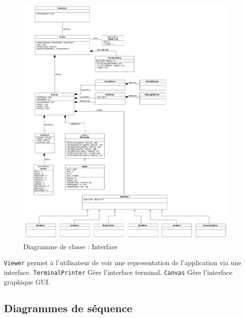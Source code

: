\documentclass[a4paper,10pt]{article}
\newcommand{\cmd}{\texttt}
\begin{document}
\begin{figure}[H]
	\includegraphics[width=7in]{class/interface.pdf}
	\caption{Diagramme de classe : Interface}
\end{figure}
 \cmd{Viewer} permet à l'utilisateur de voir une representation de l'application via une interface.
\cmd{TerminalPrinter} Gère l'interface terminal.
\cmd{Canvas} Gère l'interface graphique GUI.

\subsection{Diagrammes de séquence}
\end{document}
